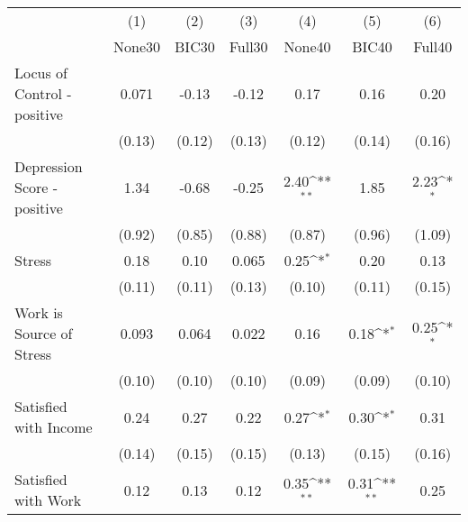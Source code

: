 {
\def\sym#1{\ifmmode^{#1}\else\(^{#1}\)\fi}
\begin{tabular}{l*{6}{c}}
\toprule
            &\multicolumn{1}{c}{(1)}&\multicolumn{1}{c}{(2)}&\multicolumn{1}{c}{(3)}&\multicolumn{1}{c}{(4)}&\multicolumn{1}{c}{(5)}&\multicolumn{1}{c}{(6)}\\
            &\multicolumn{1}{c}{None30}&\multicolumn{1}{c}{BIC30}&\multicolumn{1}{c}{Full30}&\multicolumn{1}{c}{None40}&\multicolumn{1}{c}{BIC40}&\multicolumn{1}{c}{Full40}\\
\midrule
Locus of Control - positive&       0.071         &       -0.13         &       -0.12         &        0.17         &        0.16         &        0.20         \\
            &      (0.13)         &      (0.12)         &      (0.13)         &      (0.12)         &      (0.14)         &      (0.16)         \\
\addlinespace
Depression Score - positive&        1.34         &       -0.68         &       -0.25         &        2.40\sym{**} &        1.85         &        2.23\sym{*}  \\
            &      (0.92)         &      (0.85)         &      (0.88)         &      (0.87)         &      (0.96)         &      (1.09)         \\
\addlinespace
Stress      &        0.18         &        0.10         &       0.065         &        0.25\sym{*}  &        0.20         &        0.13         \\
            &      (0.11)         &      (0.11)         &      (0.13)         &      (0.10)         &      (0.11)         &      (0.15)         \\
\addlinespace
Work is Source of Stress&       0.093         &       0.064         &       0.022         &        0.16         &        0.18\sym{*}  &        0.25\sym{*}  \\
            &      (0.10)         &      (0.10)         &      (0.10)         &      (0.09)         &      (0.09)         &      (0.10)         \\
\addlinespace
Satisfied with Income&        0.24         &        0.27         &        0.22         &        0.27\sym{*}  &        0.30\sym{*}  &        0.31         \\
            &      (0.14)         &      (0.15)         &      (0.15)         &      (0.13)         &      (0.15)         &      (0.16)         \\
\addlinespace
Satisfied with Work&        0.12         &        0.13         &        0.12         &        0.35\sym{**} &        0.31\sym{**} &        0.25         \\

\end{tabular}}
